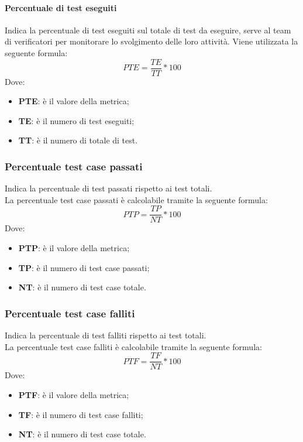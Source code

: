 \paragraph{Percentuale di test eseguiti} \Spazio
Indica la percentuale di test eseguiti sul totale di test da eseguire, serve al team di verificatori per monitorare lo svolgimento delle loro attività.
Viene utilizzata la seguente formula:
$$PTE=\frac{TE}{TT}*100$$
Dove:
\begin{itemize}
	\item{\textbf{PTE}: è il valore della metrica;}
	\item{\textbf{TE}: è il numero di test eseguiti;}
	\item{\textbf{TT}: è il numero di totale di test.}
\end{itemize}

\subsubsection{Percentuale test case passati}
Indica la percentuale di test passati rispetto ai test totali.\\
La percentuale test case passati è calcolabile tramite la seguente formula:
$$PTP=\frac{TP}{NT}*100$$
Dove:
\begin{itemize}
	\item{\textbf{PTP}: è il valore della metrica;}
	\item{\textbf{TP}: è il numero di test case passati;}
	\item{\textbf{NT}: è il numero di test case totale.}
\end{itemize}

\subsubsection{Percentuale test case falliti}
Indica la percentuale di test falliti rispetto ai test totali.\\
La percentuale test case falliti è calcolabile tramite la seguente formula:
$$PTF=\frac{TF}{NT}*100$$
Dove:
\begin{itemize}
	\item{\textbf{PTF}: è il valore della metrica;}
	\item{\textbf{TF}: è il numero di test case falliti;}
	\item{\textbf{NT}: è il numero di test case totale.}
\end{itemize}


